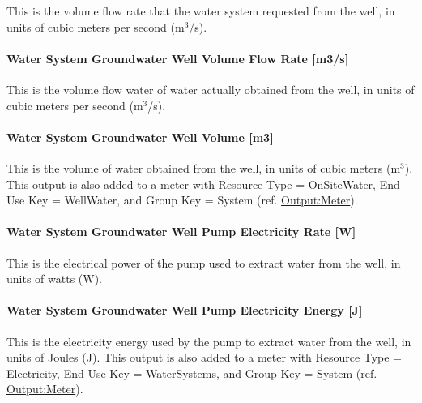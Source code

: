 This is the volume flow rate that the water system requested from the well, in units of cubic meters per second (m\(^{3}\)/s).

\paragraph{Water System Groundwater Well Volume Flow Rate {[}m3/s{]}}\label{water-system-groundwater-well-volume-flow-rate-m3s}

This is the volume flow water of water actually obtained from the well, in units of cubic meters per second (m\(^{3}\)/s).

\paragraph{Water System Groundwater Well Volume {[}m3{]}}\label{water-system-groundwater-well-volume-m3}

This is the volume of water obtained from the well, in units of cubic meters (m\(^{3}\)). This output is also added to a meter with Resource Type = OnSiteWater, End Use Key = WellWater, and Group Key = System (ref. \hyperref[outputmeter-and-outputmetermeterfileonly]{Output:Meter}).

\paragraph{Water System Groundwater Well Pump Electricity Rate {[}W{]}}\label{water-system-groundwater-well-pump-electric-power-w}

This is the electrical power of the pump used to extract water from the well, in units of watts (W).

\paragraph{Water System Groundwater Well Pump Electricity Energy {[}J{]}}\label{water-system-groundwater-well-pump-electric-energy-j}

This is the electricity energy used by the pump to extract water from the well, in units of Joules (J). This output is also added to a meter with Resource Type = Electricity, End Use Key = WaterSystems, and Group Key = System (ref. \hyperref[outputmeter-and-outputmetermeterfileonly]{Output:Meter}).
